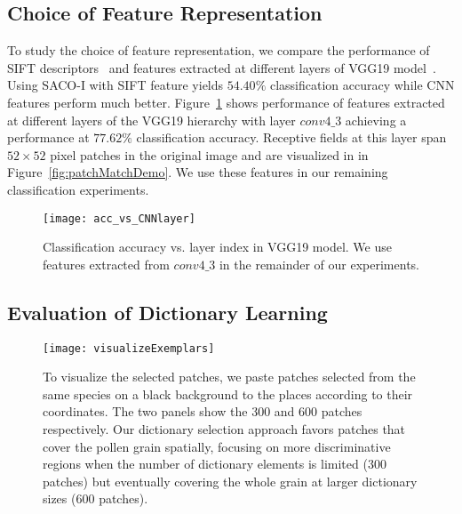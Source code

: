 \documentclass[10pt,twocolumn,letterpaper]{article}
\begin{document}
\subsection{Choice of Feature Representation}
To study the choice of feature representation, we compare the performance of
SIFT descriptors~\cite{lowe2004distinctive} and features extracted at different
layers of VGG19 model~\cite{simonyan2014very}.  Using SACO-I with SIFT feature
yields $54.40\%$ classification accuracy while CNN features perform much
better.  Figure~\ref{fig:acc_vs_CNNlayer} shows performance of features
extracted at different layers of the VGG19 hierarchy with layer $conv4\_3$
achieving a performance at $77.62\%$ classification accuracy. Receptive fields
at this layer span $52\times52$ pixel patches in the original image and are
visualized in in Figure~\ref{fig:patchMatchDemo}.  We use these features in our
remaining classification experiments.




\begin{figure}[t]
\centering
   \texttt{[image: acc\_vs\_CNNlayer]}
\vspace{-0.5mm}
   \caption{Classification accuracy vs. layer index in VGG19 model. We use
   features extracted from $conv4\_3$ in the remainder of our experiments.}
\label{fig:acc_vs_CNNlayer}
\vspace{-3mm}
\end{figure}


\subsection{Evaluation of Dictionary Learning}

\begin{figure}[t]
\centering
   \texttt{[image: visualizeExemplars]}
\vspace{-1mm}
   \caption{To visualize the selected patches, we paste patches selected from
   the same species on a black background to the places according to their
   coordinates.  The two panels show the 300 and 600 patches respectively.
   Our dictionary selection approach favors patches that cover the pollen grain
   spatially, focusing on more discriminative regions when the number of
   dictionary elements is limited (300 patches) but eventually covering the
   whole grain at larger dictionary sizes (600 patches).
   }
\label{fig:visualizeExemplars}
\vspace{-3mm}
\end{figure}
\end{document}
